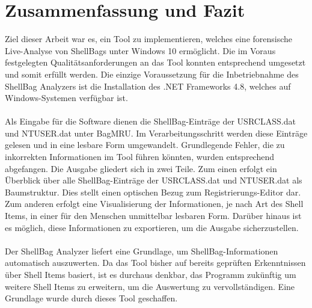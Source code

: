 \section{Zusammenfassung und Fazit}
\vspace{0.5cm}
Ziel dieser Arbeit war es, ein Tool zu implementieren, welches eine forensische Live-Analyse von ShellBags unter Windows 10 ermöglicht. Die im Voraus festgelegten Qualitätsanforderungen an das Tool konnten entsprechend umgesetzt und somit erfüllt werden. Die einzige Voraussetzung für die Inbetriebnahme des \glqq ShellBag Analyzers\grqq{} ist die Installation des .NET Frameworks 4.8, welches auf Windows-Systemen verfügbar ist. \\
\\
Als Eingabe für die Software dienen die ShellBag-Einträge der USRCLASS.dat und NTUSER.dat unter BagMRU. Im Verarbeitungsschritt werden diese Einträge gelesen und in eine lesbare Form umgewandelt. Grundlegende Fehler, die zu inkorrekten Informationen im Tool führen könnten, wurden entsprechend abgefangen. Die Ausgabe gliedert sich in zwei Teile. Zum einen erfolgt ein Überblick über alle ShellBag-Einträge der USRCLASS.dat und NTUSER.dat als Baumstruktur. Dies stellt einen optischen Bezug zum Registrierungs-Editor dar. Zum anderen erfolgt eine Visualisierung der Informationen, je nach Art des Shell Items, in einer für den Menschen unmittelbar lesbaren Form. Darüber hinaus ist  es möglich, diese Informationen zu exportieren, um die Ausgabe sicherzustellen. \\
\\
Der \glqq ShellBag Analyzer\grqq{} liefert eine Grundlage, um ShellBag-Informationen automatisch auszuwerten. Da das Tool bisher auf bereits geprüften Erkenntnissen über Shell Items basiert, ist es durchaus denkbar, das Programm zukünftig um weitere Shell Items zu erweitern, um die Auswertung zu vervollständigen. Eine Grundlage wurde durch dieses Tool geschaffen.

